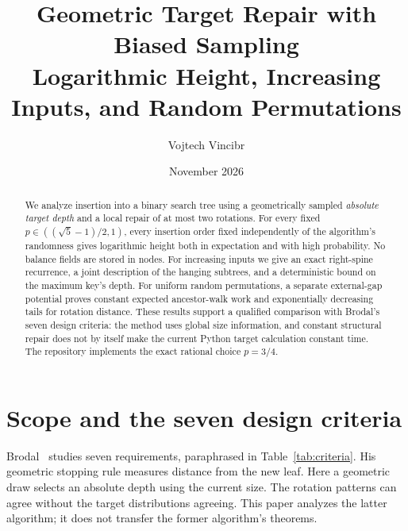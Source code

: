 \documentclass[11pt]{article}
\title{Geometric Target Repair with Biased Sampling\\
\large Logarithmic Height, Increasing Inputs, and Random Permutations}
\author{Vojtech Vincibr}
\date{November 2026}
\begin{document}
\maketitle
\begin{abstract}
We analyze insertion into a binary search tree using a geometrically sampled
\emph{absolute target depth} and a local repair of at most two rotations.
For every fixed $p\in((\sqrt5-1)/2,1)$, every insertion order fixed independently of
the algorithm's randomness gives logarithmic height both in expectation and
with high probability. No balance fields are stored in nodes. For increasing
inputs we give an exact right-spine recurrence, a joint description of the
hanging subtrees, and a deterministic bound on the maximum key's depth.
For uniform random permutations, a separate external-gap potential proves
constant expected ancestor-walk work and exponentially decreasing tails for
rotation distance. These results support a qualified comparison with Brodal's
seven design criteria: the method uses global size information, and constant
structural repair does not by itself make the current Python target calculation
constant time. The repository implements the exact rational choice $p=3/4$.
\end{abstract}

\section{Scope and the seven design criteria}
Brodal~\cite[Introduction]{brodal} studies seven requirements, paraphrased in
Table~\ref{tab:criteria}. His geometric stopping rule measures distance from the
new leaf. Here a geometric draw selects an absolute depth using the current
size. The rotation patterns can agree without the target distributions agreeing.
This paper analyzes the latter algorithm; it does not transfer the former
algorithm's theorems.
\end{document}
